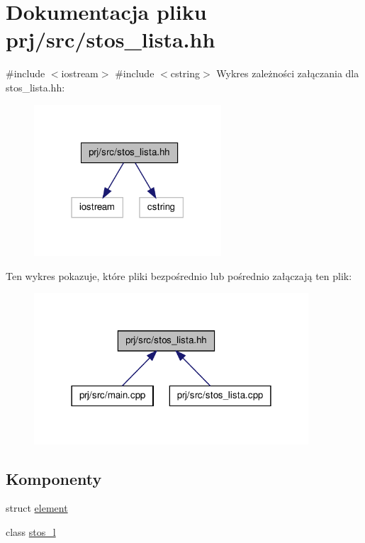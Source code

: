 \hypertarget{stos__lista_8hh}{\section{\-Dokumentacja pliku prj/src/stos\-\_\-lista.hh}
\label{stos__lista_8hh}
}
{\ttfamily \#include $<$iostream$>$}\*
{\ttfamily \#include $<$cstring$>$}\*
\-Wykres zależności załączania dla stos\-\_\-lista.\-hh\-:\nopagebreak
\begin{figure}[H]
\begin{center}
\leavevmode
\includegraphics[width=198pt]{stos__lista_8hh__incl}
\end{center}
\end{figure}
\-Ten wykres pokazuje, które pliki bezpośrednio lub pośrednio załączają ten plik\-:\nopagebreak
\begin{figure}[H]
\begin{center}
\leavevmode
\includegraphics[width=290pt]{stos__lista_8hh__dep__incl}
\end{center}
\end{figure}
\subsection*{\-Komponenty}
\begin{DoxyCompactItemize}
\item 
struct \hyperlink{structelement}{element}
\item 
class \hyperlink{classstos__l}{stos\-\_\-l}
\end{DoxyCompactItemize}
